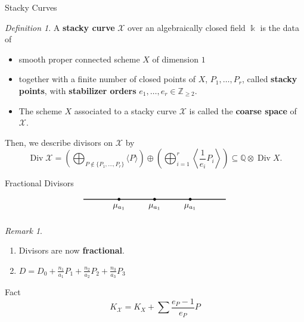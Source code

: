 \documentclass{beamer}
\theoremstyle{remark}
\newtheorem{rem}[thm]{Remark}
\newtheorem{defn}[thm]{Definition}
\newcommand\BQ{{\mathbb Q}}
\newcommand\BZ{{\mathbb Z}}
\newcommand \sx{{\mathscr X}}
\DeclareMathOperator\di{Div}
\newcommand\Bk{{\Bbbk}}
\begin{document}
\begin{frame}{Stacky Curves}
\begin{defn}
A \textbf{stacky curve} $\sx$ over an algebraically closed field $\Bk$
is the data of
	\begin{itemize}
		\item smooth proper connected scheme $X$ of dimension $1$ \\ 
		\item together with a finite number of closed points of $X$, $P_
			1, \ldots, P_r$, called {\bf stacky points}, with {\bf stabilizer 
			orders} $e_1, \ldots, e_r \in \BZ_{\geq 2}.$ \\ 
		\item The scheme $X$ associated to a stacky curve $\sx$ is 
			called the {\bf coarse space} of $\sx$.
	\end{itemize}
\end{defn}



Then, we describe divisors on $\sx$ by
\[
	\di \sx = \left(\bigoplus_{P\notin \{P_1, \ldots, P_r\}} \langle 
	P \rangle \right) \oplus \left(\bigoplus_{i = 1}^r \left \langle 
	\frac{1}{e_i}P_i \right \rangle \right) \subseteq \BQ \otimes \di X.
\]

\end{frame}


\begin{frame}{Fractional Divisors}

\begin{equation} \label{pic:M-curve} \notag
  \begin{tikzpicture}
    \draw[thick] (-3,0) -- (3,0);
    \filldraw[draw=black,fill=black] (-1.5,0) node [below=2pt]
    {$\mu_{a_1}$} circle (1.5pt); \filldraw[draw=black,fill=black] (0,0)
    node [below=2pt] {$\mu_{a_1}$} circle (1.5pt);
    \filldraw[draw=black,fill=black] (1.5,0) node [below=2pt] {$\mu_{a_1}$}
    circle (1.5pt);
  \end{tikzpicture}
\end{equation}

\begin{rem}
  \begin{enumerate}
  \item Divisors are now \textbf{fractional}.
  \item $D = D_0 + \frac{n_{1}}{a_1}P_1 + \frac{n_{2}}{a_2}P_2 + \frac{n_{3}}{a_3}P_{3}$
  \end{enumerate}

\end{rem}

\begin{block}{Fact}
\[
	K_{\sx} = K_X + \sum \frac{e_P-1}{e_P} P
\]
\end{block}

\end{frame}
\end{document}
